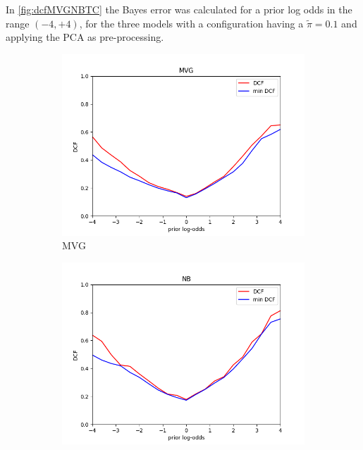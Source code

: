 In \autoref{fig:dcfMVGNBTC} the Bayes error was calculated for a prior log odds in the range \((-4, +4)\), for the
three models with a configuration having a \(\tilde{\pi} = 0.1\) and applying the PCA as pre-processing.

\begin{figure}
    \centering
    \begin{subfigure}[b]{0.3\linewidth}
        \includegraphics[width=\linewidth]{Lab/07. Lab 07/Images/01. MVG}
        \caption{MVG}
        \label{fig:dcfMVG}
    \end{subfigure}
    \begin{subfigure}[b]{0.3\linewidth}
        \includegraphics[width=\linewidth]{Lab/07. Lab 07/Images/02. Naive Bayes}

\end{subfigure}
\end{figure}
